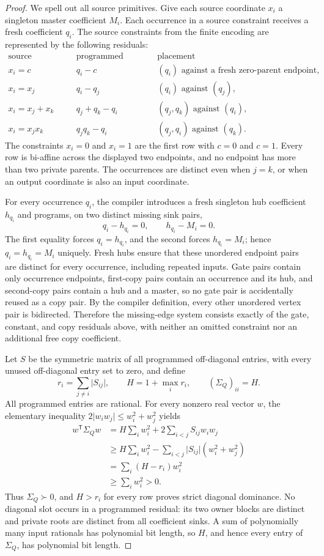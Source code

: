 \documentclass{article}
\begin{document}
\begin{proof}
We spell out all source primitives.  Give each source coordinate \(x_i\) a singleton master coefficient \(M_i\).  Each occurrence in a source constraint receives a fresh coefficient \(q_i\).  The source constraints from the finite encoding are represented by the following residuals:
\[
\begin{array}{c|c|c}
\text{source constraint}&\text{programmed residual}&\text{placement}\\ \hline
x_i=c&q_i-c&(q_i)\text{ against a fresh zero-parent endpoint},\\
x_i=x_j&q_i-q_j&(q_i)\text{ against }(q_j),\\
x_i=x_j+x_k&q_j+q_k-q_i&(q_j,q_k)\text{ against }(q_i),\\
x_i=x_jx_k&q_jq_k-q_i&(q_j,q_i)\text{ against }(q_k).
\end{array}
\]
The constraints \(x_i=0\) and \(x_i=1\) are the first row with \(c=0\) and \(c=1\).  Every row is bi-affine across the displayed two endpoints, and no endpoint has more than two private parents.  The occurrences are distinct even when \(j=k\), or when an output coordinate is also an input coordinate.

For every occurrence \(q_i\), the compiler introduces a fresh singleton hub coefficient \(h_{q_i}\) and programs, on two distinct missing sink pairs,
\[
q_i-h_{q_i}=0,
\qquad
h_{q_i}-M_i=0.
\]
The first equality forces \(q_i=h_{q_i}\), and the second forces \(h_{q_i}=M_i\); hence \(q_i=h_{q_i}=M_i\) uniquely.  Fresh hubs ensure that these unordered endpoint pairs are distinct for every occurrence, including repeated inputs.  Gate pairs contain only occurrence endpoints, first-copy pairs contain an occurrence and its hub, and second-copy pairs contain a hub and a master, so no gate pair is accidentally reused as a copy pair.  By the compiler definition, every other unordered vertex pair is bidirected.  Therefore the missing-edge system consists exactly of the gate, constant, and copy residuals above, with neither an omitted constraint nor an additional free copy coefficient.

Let \(S\) be the symmetric matrix of all programmed off-diagonal entries, with every unused off-diagonal entry set to zero, and define
\[
r_i=\sum_{j\ne i}\lvert S_{ij}\rvert,
\qquad
H=1+\max_i r_i,
\qquad
(\Sigma_Q)_{ii}=H.
\]
All programmed entries are rational.  For every nonzero real vector \(w\), the elementary inequality \(2\lvert w_iw_j\rvert\leq w_i^2+w_j^2\) yields
\[
\begin{aligned}
w^{\mathsf T}\Sigma_Qw
&=H\sum_i w_i^2+2\sum_{i<j}S_{ij}w_iw_j\\
&\geq H\sum_iw_i^2-
  \sum_{i<j}\lvert S_{ij}\rvert(w_i^2+w_j^2)\\
&=\sum_i(H-r_i)w_i^2\\
&\geq\sum_iw_i^2>0.
\end{aligned}
\]
Thus \(\Sigma_Q\succ0\), and \(H>r_i\) for every row proves strict diagonal dominance.  No diagonal slot occurs in a programmed residual: its two owner blocks are distinct and private roots are distinct from all coefficient sinks.  A sum of polynomially many input rationals has polynomial bit length, so \(H\), and hence every entry of \(\Sigma_Q\), has polynomial bit length.


\end{proof}
\end{document}
